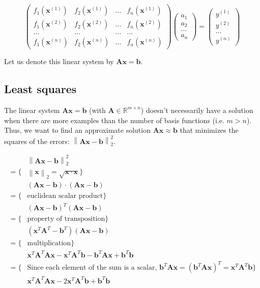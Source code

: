 \documentclass[10pt]{article}%
\renewcommand{\vec}[1]{\boldsymbol{#1}}
\newcommand{\norm}[1]{\left\lVert#1\right\rVert}
\begin{document}
\[
\left( \begin{array}{ccccc}
f_1(\vec{x}^{(1)}) & f_2(\vec{x}^{(1)}) & \dots & f_n(\vec{x}^{(1)}) \\
f_1(\vec{x}^{(2)}) & f_2(\vec{x}^{(2)}) & \dots & f_n(\vec{x}^{(2)}) \\
\dots & \dots & \dots & \dots \\
f_1(\vec{x}^{(n)}) & f_2(\vec{x}^{(n)}) & \dots & f_n(\vec{x}^{(n)})
\end{array} \right)
\left( \begin{array}{c}
a_1 \\ a_2 \\ \dots \\ a_{n} 
\end{array} \right)
=
\left( \begin{array}{c}
y^{(1)} \\ y^{(2)} \\ \dots \\ y^{(n)} 
\end{array} \right)
\]

Let us denote this linear system by $\vec{A}\vec{x}=\vec{b}$.

\subsection{Least squares}
The linear system $\vec{A}\vec{x}=\vec{b}$
(with $\vec{A} \in \mathbb{R}^{m \times n}$) doesn't necessarily have a solution
when there are more examples than the number of basis functions (i.e. $m>n$).
Thus, we want to find an approximate solution $\vec{A}\vec{x}\approx\vec{b}$
that minimizes the squares of the errors: $\norm{\vec{A}\vec{x}-\vec{b}}^2_2$.

\begin{align*}
 & \norm{\vec{A}\vec{x}-\vec{b}}^2_2 \\
= \{ & \norm{\vec{x}}_2 = \sqrt{\vec{x}\cdot\vec{x}} \} \\
 & \left(\vec{A}\vec{x}-\vec{b}\right) \cdot \left(\vec{A}\vec{x}-\vec{b}\right) \\
= \{ & \text{euclidean scalar product} \} \\
 & \left(\vec{A}\vec{x}-\vec{b}\right)^T \left(\vec{A}\vec{x}-\vec{b}\right) \\
= \{ & \text{property of transposition} \} \\
 & \left(\vec{x}^T\vec{A}^T - \vec{b}^T \right) \left(\vec{A}\vec{x}-\vec{b}\right) \\
= \{ & \text{multiplication} \} \\
 & \vec{x}^T\vec{A}^T\vec{A}\vec{x} - \vec{x}^T\vec{A}^T\vec{b} - \vec{b}^T\vec{A}\vec{x} + \vec{b}^T\vec{b} \\
= \{ & \text{Since each element of the sum is a scalar, } \vec{b}^T\vec{A}\vec{x} = \left(\vec{b}^T\vec{A}\vec{x}\right)^T = \vec{x}^T\vec{A}^T\vec{b} \} \\
 & \vec{x}^T\vec{A}^T\vec{A}\vec{x} - 2\vec{x}^T\vec{A}^T\vec{b} + \vec{b}^T\vec{b}
\end{align*}
\end{document}
